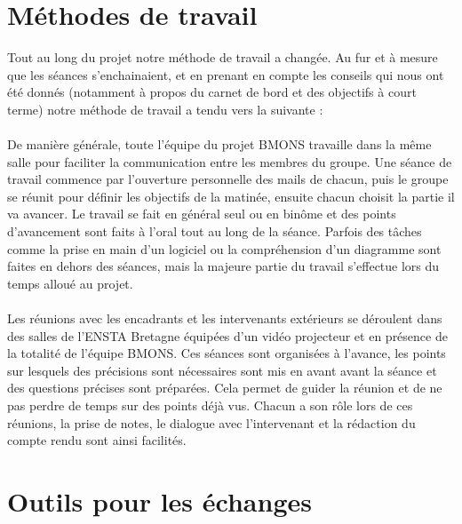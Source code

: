 \chapter{Méthodes de travail}


Tout au long du projet notre méthode de travail a changée. Au fur et à mesure que les séances s'enchainaient, et en prenant en compte les conseils qui nous ont été donnés (notamment à propos du carnet de bord et des objectifs à court terme) notre méthode de travail a tendu vers la suivante : \\ \\
De manière générale, toute l'équipe du projet BMONS travaille dans la même salle pour faciliter la communication entre les membres du groupe. Une séance de travail commence par l'ouverture personnelle des mails de chacun, puis le groupe se réunit pour définir les objectifs de la matinée, ensuite chacun choisit la partie il va avancer. Le travail se fait en général seul ou en binôme et des points d'avancement sont faits à l'oral tout au long de la séance. Parfois des tâches comme la prise en main d'un logiciel ou la compréhension d'un diagramme sont faites en dehors des séances, mais la majeure partie du travail s'effectue lors du temps alloué au projet. \\ \\
Les réunions avec les encadrants et les intervenants extérieurs se déroulent dans des salles de l'ENSTA Bretagne équipées d'un vidéo projecteur et en présence de la totalité de l'équipe BMONS. Ces séances sont organisées à l'avance, les points sur lesquels des précisions sont nécessaires sont mis en avant avant la séance et des questions précises sont préparées. Cela permet de guider la réunion et de ne pas perdre de temps sur des points déjà vus. Chacun a son rôle lors de ces réunions, la prise de notes, le dialogue avec l'intervenant et la rédaction du compte rendu sont ainsi facilités.


 

\chapter{Outils pour les échanges}


